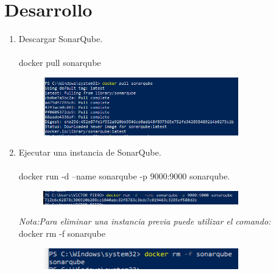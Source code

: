 \documentclass{report}
\begin{document}
		
	
	
	
	\chapter{Desarrollo}
	
	\begin{enumerate}
		\item {\large Descargar SonarQube.}\\\\
		docker pull sonarqube \\ 
		
		\begin{figure}[htb]
			\centering
			\includegraphics[width=0.8\textwidth]{img/instalacion.png}
			\label{fig:instalacion}
		\end{figure}
		
		\item {\large Ejecutar una instancia de SonarQube.}\\\\
		
		docker run -d --name sonarqube -p 9000:9000 sonarqube.\\ 
		
		\begin{figure}[htb]
			\centering
			\includegraphics[width=0.8\textwidth]{img/ejecucion.png}
			\label{fig:ejecucion}
		\end{figure}
	
		\textit{Nota:Para eliminar una instancia previa puede utilizar el comando:}\\ 
		
		 docker rm -f sonarqube \\
		 
		 \begin{figure}[htb]
		 	\centering
		 	\includegraphics[width=0.8\textwidth]{img/eliminacion.png}
		 	\label{fig:eliminacion}
		 \end{figure}
		  

\end{enumerate}
\end{document}
